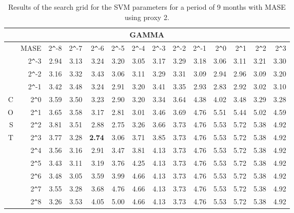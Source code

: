 \begin{table}[h!]
\centering
\begin{adjustbox}{width=\textwidth}
\begin{tabular}{|r|r|rrrrrrrrrrrr|}
\hline
\multicolumn{14}{|c|}{GAMMA} \tabularnewline
\hline
    &MASE& 2\verb|^|-8 & 2\verb|^|-7 & 2\verb|^|-6 & 2\verb|^|-5 & 2\verb|^|-4 & 2\verb|^|-3 & 2\verb|^|-2 & 2\verb|^|-1 & 2\verb|^|0 & 2\verb|^|1 & 2\verb|^|2 & 2\verb|^|3 \\ 
  \hline
  &2\verb|^|-3 & 2.94 & 3.13 & 3.24 & 3.20 & 3.05 & 3.17 & 3.29 & 3.18 & 3.06 & 3.11 & 3.21 & 3.30 \\ 
  &2\verb|^|-2 & 3.16 & 3.32 & 3.43 & 3.06 & 3.11 & 3.29 & 3.31 & 3.09 & 2.94 & 2.96 & 3.09 & 3.20 \\ 
  &2\verb|^|-1 & 3.42 & 3.48 & 3.24 & 2.91 & 3.20 & 3.41 & 3.35 & 2.93 & 2.83 & 2.92 & 3.02 & 3.10 \\ 
  C&2\verb|^|0 & 3.59 & 3.50 & 3.23 & 2.90 & 3.20 & 3.34 & 3.64 & 4.38 & 4.02 & 3.48 & 3.29 & 3.28 \\ 
  O&2\verb|^|1 & 3.65 & 3.58 & 3.17 & 2.81 & 3.01 & 3.46 & 3.69 & 4.76 & 5.51 & 5.44 & 5.02 & 4.59 \\ 
  S&2\verb|^|2 & 3.81 & 3.51 & 2.88 & 2.75 & 3.26 & 3.66 & 3.73 & 4.76 & 5.53 & 5.72 & 5.38 & 4.92 \\ 
  T&2\verb|^|3 & 3.77 & 3.28 & \textbf{2.74} & 3.06 & 3.71 & 3.85 & 3.73 & 4.76 & 5.53 & 5.72 & 5.38 & 4.92 \\ 
  &2\verb|^|4 & 3.56 & 3.16 & 2.91 & 3.47 & 3.81 & 4.13 & 3.73 & 4.76 & 5.53 & 5.72 & 5.38 & 4.92 \\ 
  &2\verb|^|5 & 3.43 & 3.11 & 3.19 & 3.76 & 4.25 & 4.13 & 3.73 & 4.76 & 5.53 & 5.72 & 5.38 & 4.92 \\ 
  &2\verb|^|6 & 3.48 & 3.05 & 3.59 & 3.99 & 4.66 & 4.13 & 3.73 & 4.76 & 5.53 & 5.72 & 5.38 & 4.92 \\ 
  &2\verb|^|7 & 3.55 & 3.28 & 3.68 & 4.76 & 4.66 & 4.13 & 3.73 & 4.76 & 5.53 & 5.72 & 5.38 & 4.92 \\ 
  &2\verb|^|8 & 3.26 & 3.53 & 4.05 & 5.00 & 4.66 & 4.13 & 3.73 & 4.76 & 5.53 & 5.72 & 5.38 & 4.92 \\ 
   \hline
\end{tabular}
\end{adjustbox}
\caption{Results of the search grid for the SVM parameters for a period of 9 months with MASE using proxy 2.}
\end{table}